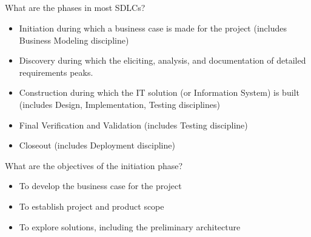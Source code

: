 \documentclass[10pt,a4paper,answers]{exam}
\title{\choosedocumenttitle \vspace{-1ex}\begin{large}\em \modulename \end{large} \\}
\author{\chooseshowname}
\date{\choosedate}
\begin{document}
\maketitle
\thispagestyle{empty} %
\begin{questions}


\question What are the phases in most SDLCs?
\begin{solution}
\begin{itemize}

        \item Initiation during which a business case is made for the project (includes Business Modeling discipline)
        \item Discovery during which the eliciting, analysis, and documentation of detailed requirements peaks.
        \item Construction during which the IT solution (or Information System) is built (includes Design, Implementation, Testing disciplines)
        \item Final Verification and Validation (includes Testing discipline)
        \item Closeout (includes Deployment discipline)
        
\end{itemize}
\end{solution}


\question What are the objectives of the initiation phase?
\begin{solution}
\begin{itemize}

        \item To develop the business case for the project
        \item To establish project and product scope
        \item To explore solutions, including the preliminary architecture

\end{itemize}
\end{solution}



\end{questions}
\end{document}
